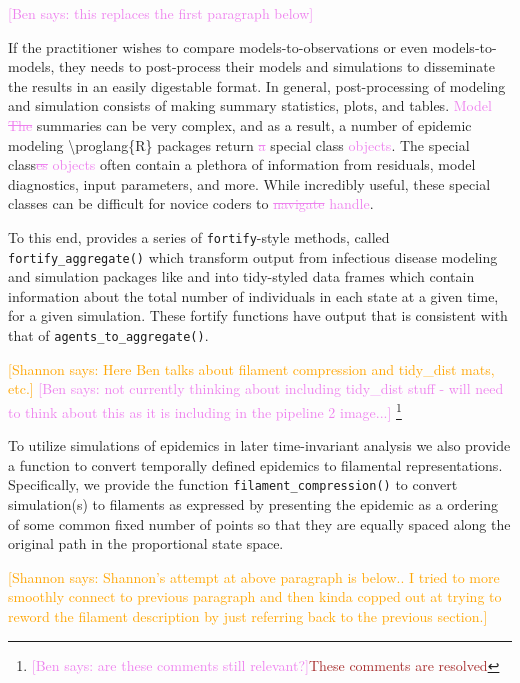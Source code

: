 \documentclass[
  shortnames]{jss}
\begin{document}
\textcolor{violet}{[Ben says: this replaces the first paragraph below]}

If the practitioner wishes to compare models-to-observations or even
models-to-models, they needs to post-process their models and
simulations to disseminate the results in an easily digestable format.
In general, post-processing of modeling and simulation consists of
making summary statistics, plots, and tables.
\textcolor{violet}{Model \sout{The}} summaries can be very complex, and
as a result, a number of epidemic modeling \textbackslash proglang\{R\}
packages return \textcolor{violet}{\sout{a}} special class
\textcolor{violet}{objects}. The special
class\textcolor{violet}{\sout{es} objects} often contain a plethora of
information from residuals, model diagnostics, input parameters, and
more. While incredibly useful, these special classes can be difficult
for novice coders to \textcolor{violet}{\sout{navigate} handle}.

To this end,  provides a series of
\texttt{fortify}-style methods, called \texttt{fortify\_aggregate()}
which transform output from infectious disease modeling and simulation
packages like  and  into tidy-styled data frames
which contain information about the total number of individuals in each
state at a given time, for a given simulation. These fortify functions
have output that is consistent with that of
\texttt{agents\_to\_aggregate()}.

\textcolor{orange}{[Shannon says: Here Ben talks about filament compression and tidy\_dist mats, etc.]}
\textcolor{violet}{[Ben says: not currently thinking about including tidy\_dist stuff - will need to think about this as it is including in the pipeline 2 image...]}
\footnote{\textcolor{violet}{[Ben says: are these comments still relevant?]}\textcolor{brown}{These comments are resolved}}

To utilize simulations of epidemics in later time-invariant analysis we
also provide a function to convert temporally defined epidemics to
filamental representations. Specifically, we provide the function
\texttt{filament\_compression()} to convert simulation(s) to filaments
as expressed by presenting the epidemic as a ordering of some common
fixed number of points so that they are equally spaced along the
original path in the proportional state space.

\textcolor{orange}{[Shannon says: Shannon's attempt at above paragraph is below..  I tried to more smoothly connect to previous paragraph and then kinda copped out at trying to reword the filament description by just referring back to the previous section.]}
\end{document}
